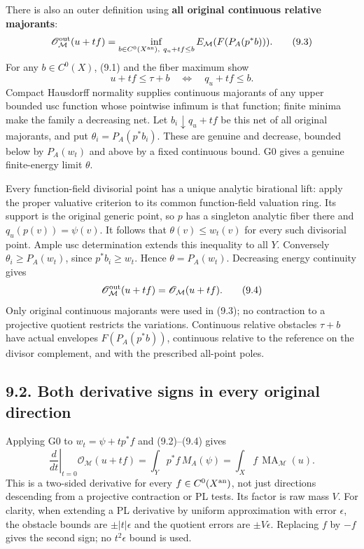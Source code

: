 \documentclass[
  10pt,
]{article}
\begin{document}
There is also an outer definition using \textbf{all original continuous
relative majorants}: \[\mathscr O^{\rm out}_{\mathcal M}(u+tf)
=\inf_{b\in C^0(X^{\rm an}),\ q_u+tf\leq b}
E_{\mathcal M}(F(P_A(p^*b))).                            \tag{9.3}\] For
any \(b\in C^0(X)\), (9.1) and the fiber maximum show
\[u+tf\leq\tau+b\quad\Longleftrightarrow\quad q_u+tf\leq b.\] Compact
Hausdorff normality supplies continuous majorants of any upper bounded
usc function whose pointwise infimum is that function; finite minima
make the family a decreasing net. Let \(b_i\downarrow q_u+tf\) be this
net of all original majorants, and put \(\theta_i=P_A(p^*b_i)\). These
are genuine and decrease, bounded below by \(P_A(w_t)\) and above by a
fixed continuous bound. G0 gives a genuine finite-energy limit
\(\theta\).

Every function-field divisorial point has a unique analytic birational
lift: apply the proper valuative criterion to its common function-field
valuation ring. Its support is the original generic point, so \(p\) has
a singleton analytic fiber there and \(q_u(p(v))=\psi(v)\). It follows
that \(\theta(v)\leq w_t(v)\) for every such divisorial point. Ample usc
determination extends this inequality to all \(Y\). Conversely
\(\theta_i\geq P_A(w_t)\), since \(p^*b_i\geq w_t\). Hence
\(\theta=P_A(w_t)\). Decreasing energy continuity gives
\[\mathscr O^{\rm out}_{\mathcal M}(u+tf)=\mathscr O_{\mathcal M}(u+tf). \tag{9.4}\]
Only original continuous majorants were used in (9.3); no contraction to
a projective quotient restricts the variations. Continuous relative
obstacles \(\tau+b\) have actual envelopes \(F(P_A(p^*b))\), continuous
relative to the reference on the divisor complement, and with the
prescribed all-point poles.

\subsection{9.2. Both derivative signs in every original
direction}\label{both-derivative-signs-in-every-original-direction}

Applying G0 to \(w_t=\psi+t p^*f\) and (9.2)--(9.4) gives
\[\left.\frac d{dt}\right|_{t=0}\mathscr O_{\mathcal M}(u+tf)
=\int_Y p^*f\,M_A(\psi)=\int_X f\,\operatorname{MA}_{\mathcal M}(u). \tag{9.5}\]
This is a two-sided derivative for every \(f\in C^0(X^{\rm an})\), not
just directions descending from a projective contraction or PL tests.
Its factor is raw mass \(V\). For clarity, when extending a PL
derivative by uniform approximation with error \(\epsilon\), the
obstacle bounds are \(\pm|t|\epsilon\) and the quotient errors are
\(\pm V\epsilon\). Replacing \(f\) by \(-f\) gives the second sign; no
\(t^2\epsilon\) bound is used.
\end{document}
